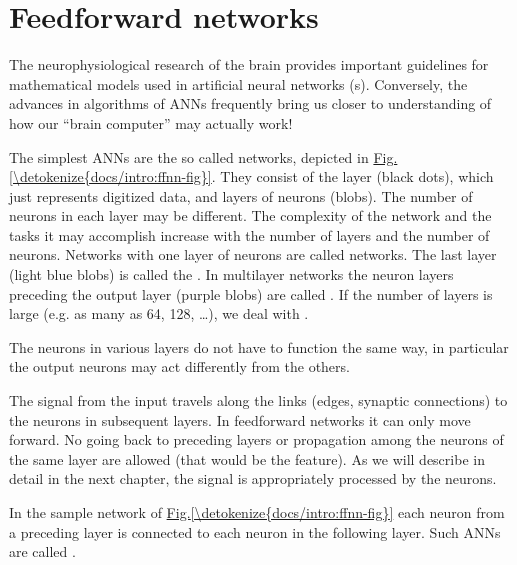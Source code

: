 \documentclass[letterpaper,10pt,english]{jupyterBook}
\begin{document}
\section{Feed\sphinxhyphen{}forward networks}
\label{\detokenize{docs/intro:feed-forward-networks}}
\sphinxAtStartPar
The neurophysiological research of the brain provides important guidelines for mathematical models used in artificial neural networks (s). Conversely, the advances in algorithms of ANNs frequently bring us closer to understanding of how our “brain computer” may actually work!

\sphinxAtStartPar
The simplest ANNs are the so called  networks, depicted in \hyperref[\detokenize{docs/intro:ffnn-fig}]{Fig.\@ \ref{\detokenize{docs/intro:ffnn-fig}}}. They consist of the  layer (black dots), which just represents digitized data, and layers of neurons (blobs). The number of neurons in each layer may be different. The complexity of the network and the tasks it may accomplish increase with the number of layers and the number of neurons. Networks with one layer of neurons are called  networks. The last layer (light blue blobs) is called the . In multi\sphinxhyphen{}layer networks the neuron layers preceding the output layer (purple blobs) are called . If the number of layers is large (e.g. as many as 64, 128, …), we deal with .

\sphinxAtStartPar
The neurons in various layers do not have to function the same way, in particular the output neurons may act differently from the others.

\sphinxAtStartPar
The signal from the input travels along the links (edges, synaptic connections) to the neurons in subsequent layers. In feed\sphinxhyphen{}forward networks it can only move forward. No going back to preceding layers or propagation among the neurons of the same layer are allowed (that would be the  feature). As we will describe in detail in the next chapter, the signal is appropriately processed by the neurons.

\sphinxAtStartPar
In the sample network of \hyperref[\detokenize{docs/intro:ffnn-fig}]{Fig.\@ \ref{\detokenize{docs/intro:ffnn-fig}}} each neuron from a preceding layer is connected to each neuron in the following layer. Such ANNs are called .
\end{document}
